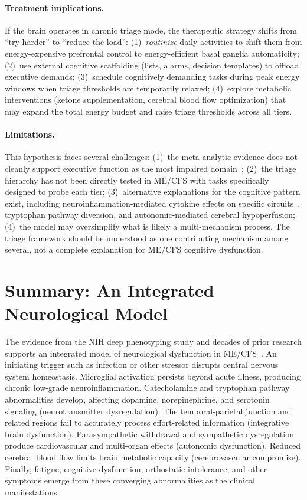 \begin{speculation}
\paragraph{Treatment implications.}
If the brain operates in chronic triage mode, the therapeutic strategy shifts from ``try harder'' to ``reduce the load'': (1)~\emph{routinize} daily activities to shift them from energy-expensive prefrontal control to energy-efficient basal ganglia automaticity; (2)~use external cognitive scaffolding (lists, alarms, decision templates) to offload executive demands; (3)~schedule cognitively demanding tasks during peak energy windows when triage thresholds are temporarily relaxed; (4)~explore metabolic interventions (ketone supplementation, cerebral blood flow optimization) that may expand the total energy budget and raise triage thresholds across all tiers.

\paragraph{Limitations.}
This hypothesis faces several challenges: (1)~the meta-analytic evidence does not cleanly support executive function as the most impaired domain~\cite{Sebaiti2022cognitive}; (2)~the triage hierarchy has not been directly tested in ME/CFS with tasks specifically designed to probe each tier; (3)~alternative explanations for the cognitive pattern exist, including neuroinflammation-mediated cytokine effects on specific circuits~\cite{Bansal2025cognitive}, tryptophan pathway diversion, and autonomic-mediated cerebral hypoperfusion; (4)~the model may oversimplify what is likely a multi-mechanism process. The triage framework should be understood as one contributing mechanism among several, not a complete explanation for ME/CFS cognitive dysfunction.
\end{speculation}

\section{Summary: An Integrated Neurological Model}
\label{sec:neuro-summary}

The evidence from the NIH deep phenotyping study and decades of prior research supports an integrated model of neurological dysfunction in ME/CFS~\cite{walitt2024deep}. An initiating trigger such as infection or other stressor disrupts central nervous system homeostasis. Microglial activation persists beyond acute illness, producing chronic low-grade neuroinflammation. Catecholamine and tryptophan pathway abnormalities develop, affecting dopamine, norepinephrine, and serotonin signaling (neurotransmitter dysregulation). The temporal-parietal junction and related regions fail to accurately process effort-related information (integrative brain dysfunction). Parasympathetic withdrawal and sympathetic dysregulation produce cardiovascular and multi-organ effects (autonomic dysfunction). Reduced cerebral blood flow limits brain metabolic capacity (cerebrovascular compromise). Finally, fatigue, cognitive dysfunction, orthostatic intolerance, and other symptoms emerge from these converging abnormalities as the clinical manifestations.

